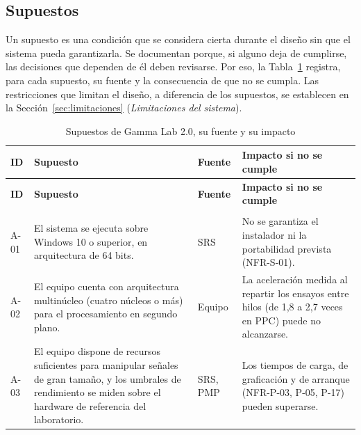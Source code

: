 \documentclass[11pt,a4paper]{article}
\DeclareRobustCommand{\_}{\textunderscore\allowbreak}
\begin{document}
\subsection{Supuestos}
\label{sec:supuestos}

Un supuesto es una condición que se considera cierta durante el diseño sin que el sistema pueda garantizarla. Se documentan porque, si alguno deja de cumplirse, las decisiones que dependen de él deben revisarse. Por eso, la Tabla~\ref{tab:supuestos} registra, para cada supuesto, su fuente y la consecuencia de que no se cumpla. Las restricciones que limitan el diseño, a diferencia de los supuestos, se establecen en la Sección~\ref{sec:limitaciones} (\textit{Limitaciones del sistema}).

\begin{longtable}{@{}>{\raggedright\arraybackslash}p{1.1cm}
                  >{\raggedright\arraybackslash}p{6.2cm}
                  >{\raggedright\arraybackslash}p{1.9cm}
                  >{\raggedright\arraybackslash}p{5.5cm}@{}}

\caption{Supuestos de Gamma Lab 2.0, su fuente y su impacto} \label{tab:supuestos} \\
\toprule
\textbf{ID} &
\textbf{Supuesto} &
\textbf{Fuente} &
\textbf{Impacto si no se cumple} \\
\midrule
\endfirsthead

\toprule
\textbf{ID} &
\textbf{Supuesto} &
\textbf{Fuente} &
\textbf{Impacto si no se cumple} \\
\midrule
\endhead

\bottomrule
\endlastfoot

\multicolumn{4}{@{}l}{\textit{Entorno de ejecución}} \\
\addlinespace[2pt]

A-01 &
El sistema se ejecuta sobre Windows 10 o superior, en arquitectura de 64 bits.
&
SRS
&
No se garantiza el instalador ni la portabilidad prevista (NFR-S-01).
\\[0.15cm]

A-02 &
El equipo cuenta con arquitectura multinúcleo (cuatro núcleos o más) para el procesamiento en segundo plano.
&
Equipo
&
La aceleración medida al repartir los ensayos entre hilos (de 1,8 a 2,7 veces en PPC) puede no alcanzarse.
\\[0.15cm]

A-03 &
El equipo dispone de recursos suficientes para manipular señales de gran tamaño, y los umbrales de rendimiento se miden sobre el hardware de referencia del laboratorio.
&
SRS, PMP
&
Los tiempos de carga, de graficación y de arranque (NFR-P-03, P-05, P-17) pueden superarse.
\\[0.15cm]


\end{longtable}
\end{document}

